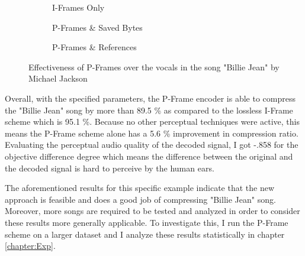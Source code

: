 \begin{figure}[ht]
\centering
\begin{subfigure}{0.30\textwidth}
    
    \caption{I-Frames Only}
    \label{fig:unmodified_3sec}
\end{subfigure}
\hfill
\begin{subfigure}{0.32\textwidth}
    
    \caption{P-Frames \& Saved Bytes}
    \label{fig:saved_3sec}
\end{subfigure}
\hfill
\begin{subfigure}{0.32\textwidth}
    
    \caption{P-Frames \& References}
    \label{fig:ref_3sec}
\end{subfigure}
\caption{Effectiveness of P-Frames over the vocals in the song "Billie Jean" by Michael Jackson}
\label{fig:billie_jean_3sec}
\end{figure}

Overall, with the specified parameters, the P-Frame encoder is able to compress the "Billie Jean" song by more than 89.5 \% as compared to the lossless I-Frame scheme which is 95.1 \%. Because no other perceptual techniques were active, this means the P-Frame scheme alone has a 5.6 \% improvement in compression ratio. Evaluating the perceptual audio quality of the decoded signal, I got -.858 for the objective difference degree which means the difference between the original and the decoded signal is hard to perceive by the human ears.

The aforementioned results for this specific example indicate that the new approach is feasible and does a good job of compressing "Billie Jean"  song. Moreover, more songs are required to be tested and analyzed in order to consider these results more generally applicable. To investigate this, I run the P-Frame scheme on a larger dataset and I analyze these results statistically in chapter \ref{chapter:Exp}.